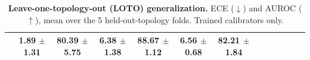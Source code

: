 \begin{table}[!t]
{\begin{tabular}{l c c c c c c c c c c c c}
                  & \textbf{1.89 {\scriptsize $\pm$ 1.31}}  & 80.39 {\scriptsize $\pm$ 5.75}
                  & \textbf{6.38 {\scriptsize $\pm$ 1.38}}  & \textbf{88.67 {\scriptsize $\pm$ 1.12}}
                  & \textbf{6.56 {\scriptsize $\pm$ 0.68}}  & \textbf{82.21 {\scriptsize $\pm$ 1.84}} \\
\bottomrule
\end{tabular}%
}
\vspace{-5pt}
\caption{\textbf{Leave-one-topology-out (LOTO) generalization.}
ECE ($\downarrow$) and AUROC ($\uparrow$), mean over the 5
held-out-topology folds. Trained calibrators only.}
\label{tab:main-loto}
\vspace{-15pt}
\end{table}
